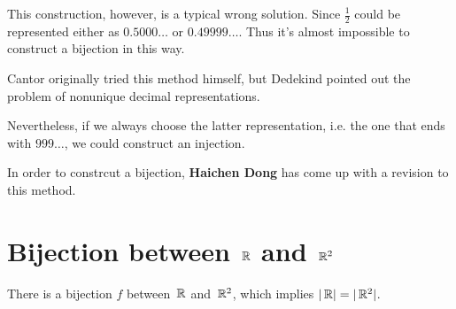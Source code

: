 This construction, however, is a typical wrong solution. Since $\frac{1}{2}$ could 
be represented either as $0.5000\ldots$ or $0.49999\ldots$. Thus it's almost impossible
to construct a bijection in this way. 

Cantor originally tried this method himself, but Dedekind pointed out the problem of nonunique decimal representations.

Nevertheless, if we always choose the latter representation, i.e. the one that ends
with $999\ldots$, we could construct 
an injection.  

In order to constrcut a bijection, \textbf{Haichen Dong}  has come up with a revision to
this method.
\section{Bijection between $\,\mathbb{R}$ and  $\,\mathbb{R}^2$}

\begin{thm}
    There is a bijection $f$ between $\,\mathbb{R} $ and $\,\mathbb{R} ^2$, which implies $|\,\mathbb{R} | = |\,\mathbb{R} ^2|$.
\end{thm}

